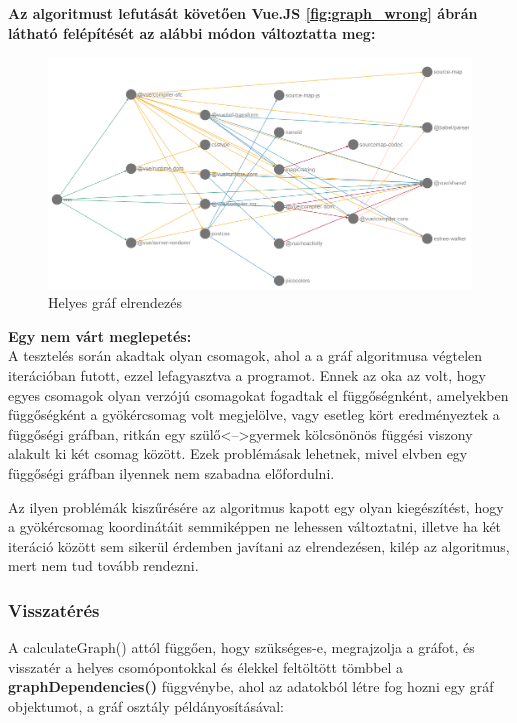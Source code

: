\pagebreak

\noindent\textbf{Az algoritmust lefutását követően Vue.JS \ref{fig:graph_wrong} ábrán látható felépítését az alábbi módon változtatta meg:}

\begin{figure}[!h]
	\centering
	\includegraphics[scale=0.4]{images/graph_right.png}
	\caption{Helyes gráf elrendezés}
	\label{fig:graph_right}
\end{figure}

\noindent\textbf{Egy nem várt meglepetés:}\\

A tesztelés során akadtak olyan csomagok, ahol a a gráf algoritmusa végtelen iterációban futott, ezzel lefagyasztva a programot.
Ennek az oka az volt, hogy egyes csomagok olyan verzójú csomagokat fogadtak el függőségnként, amelyekben függőségként a gyökércsomag volt megjelölve, vagy esetleg kört eredményeztek a függőségi gráfban, ritkán egy szülő<-->gyermek kölcsönönös függési viszony alakult ki két csomag között. Ezek problémásak lehetnek, mivel elvben egy függőségi gráfban ilyennek nem szabadna előfordulni.

Az ilyen problémák kiszűrésére az algoritmus kapott egy olyan kiegészítést, hogy a gyökércsomag koordinátáit semmiképpen ne lehessen változtatni, illetve ha két iteráció között sem sikerül érdemben javítani az elrendezésen, kilép az algoritmus, mert nem tud tovább rendezni.\\

\subsubsection{Visszatérés}

A calculateGraph() attól függően, hogy szükséges-e, megrajzolja a gráfot, és visszatér a helyes csomópontokkal és élekkel feltöltött tömbbel a \textbf{graphDependencies()} függvénybe, ahol az adatokból létre fog hozni egy gráf objektumot, a gráf osztály példányosításával:

